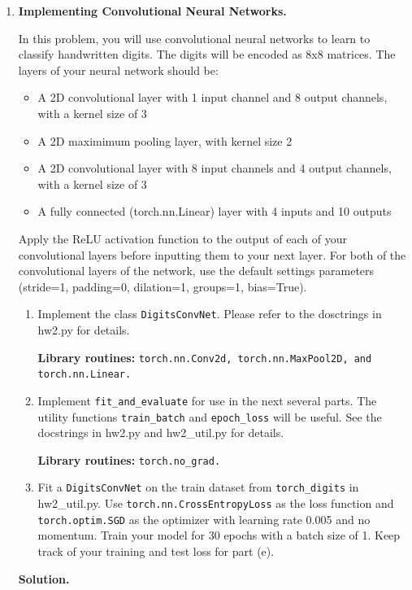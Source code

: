 \documentclass{article}
\theoremstyle{definition}
\theoremstyle{remark}
\newenvironment{Q}
{%
\clearpage
\item
}
{%
\phantom{s} %
\bigskip
\textbf{Solution.}
}
\newenvironment{Q_nosol}
{%
\clearpage
\item
}
{%
\phantom{s} %
\bigskip
}
\begin{document}
\begin{enumerate}[font={\Large\bfseries},left=0pt]
\begin{Q_nosol}
\begin{enumerate}
\begin{enumerate}
    
\end{enumerate}
 

\end{enumerate}        
    \end{Q_nosol}
    




\begin{Q}
    \textbf{\Large Implementing Convolutional Neural Networks.}

    In this problem, you will use convolutional neural networks
    to learn to classify handwritten digits.  The digits will
    be encoded as 8x8 matrices.  The layers of your neural
    network should be:
    \begin{itemize}
        \item A 2D convolutional layer with 1 input channel and 8 output channels, with a kernel size of 3
        \item A 2D maximimum pooling layer, with kernel size 2
        \item A 2D convolutional layer with 8 input channels and 4 output channels, with a kernel size of 3
        \item A fully connected (torch.nn.Linear) layer with 4 inputs and 10 outputs
    \end{itemize}
    Apply the ReLU activation function to the output
    of each of your convolutional layers before inputting them
    to your next layer.  For both of the convolutional layers
    of the network, use the default settings parameters
    (stride=1, padding=0, dilation=1, groups=1, bias=True).

    \begin{enumerate}
        \item Implement the class \texttt{DigitsConvNet}.  Please refer to the dosctrings in hw2.py for details.
        
        \textbf{Library routines:} \texttt{torch.nn.Conv2d, torch.nn.MaxPool2D, and torch.nn.Linear.}
        \item Implement \texttt{fit\_and\_evaluate} for use in
            the next several parts. The utility functions \texttt{train\_batch} and \texttt{epoch\_loss} will be useful. See the docstrings in hw2.py and hw2\_util.py for details.
            
            \textbf{Library routines:} \texttt{torch.no\_grad.}
            
        \item Fit a \texttt{DigitsConvNet} on the train dataset
            from \texttt{torch\_digits} in hw2\_util.py.  Use \texttt{torch.nn.CrossEntropyLoss} as the loss function and \texttt{torch.optim.SGD} as the optimizer with learning rate 0.005 and no momentum. Train your model for 30 epochs with a
            batch size of 1.  Keep track of your training and test loss for part (e).
            

\end{enumerate}
\end{Q}
\end{enumerate}
\end{document}
